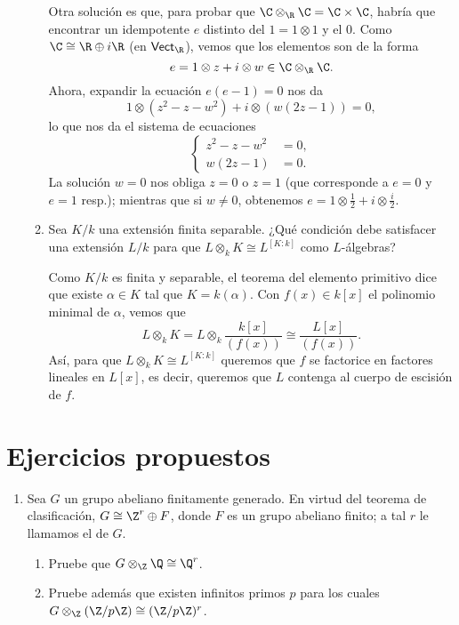 \documentclass[11pt, reqno]{amsart}
\begin{document}
\begin{enumerate}
\begin{enumerate}
\begin{sol}
					Otra solución es que, para probar que $\C\otimes_\R\C = \C\times\C$, habría que
					encontrar un idempotente $e$ distinto del $1 = 1\otimes 1$ y el 0.
					Como $\C \cong \R\oplus i\R$ (en $\mathsf{Vect}_\R$), vemos que los elementos
					son de la forma
					\[
						e = 1\otimes z + i\otimes w \in \C\otimes_\R\C.
					\]
					Ahora, expandir la ecuación $e(e - 1) = 0$ nos da
					\[
						1\otimes( z^2 - z - w^2 ) + i\otimes( w(2z - 1) ) = 0,
					\]
					lo que nos da el sistema de ecuaciones
					\[
						\left\{
						\begin{aligned}
							z^2 - z - w^2 &= 0, \\
							w(2z - 1) &= 0.
						\end{aligned}
						\right.
					\]
					La solución $w = 0$ nos obliga $z = 0$ o $z = 1$ (que corresponde a $e = 0$ y $e
					= 1$ resp.); mientras que si $w \ne 0$, obtenemos $e = 1\otimes \frac{1}{2} + i\otimes
					\frac{i}{2}$.
				\end{sol}

			\item Sea $K/k$ una extensión finita separable.
				¿Qué condición debe satisfacer una extensión $L/k$ para que $L \otimes_k K \cong
				L^{[K:k]}$ como $L$-álgebras?

				\begin{sol}
					Como $K/k$ es finita y separable, el teorema del elemento primitivo dice que
					existe $\alpha \in K$ tal que $K = k(\alpha)$.
					Con $f(x) \in k[x]$ el polinomio minimal de $\alpha$, vemos que
					\[
						L\otimes_k K = L\otimes_k \frac{k[x]}{(f(x))} \cong \frac{L[x]}{(f(x))}.
					\]
					Así, para que $L\otimes_k K \cong L^{[K:k]}$ queremos que $f$ se factorice en
					factores lineales en $L[x]$, es decir, queremos que $L$ contenga al cuerpo de
					escisión de $f$.
				\end{sol}
		\end{enumerate}
\end{enumerate}

\appendix
\section{Ejercicios propuestos}
\begin{enumerate}
	\item Sea $G$ un grupo abeliano finitamente generado.
		En virtud del teorema de clasificación, $G \cong \Z^r \oplus F$, donde $F$ es un grupo abeliano finito;
		a tal $r$ le llamamos el  de $G$.
		\begin{enumerate}
			\item Pruebe que $G \otimes_\Z \Q \cong \Q^r$.
			\item Pruebe además que existen infinitos primos $p$ para los cuales $G \otimes_\Z (\Z/p\Z)
				\cong (\Z/p\Z)^r$.
		\end{enumerate}
\end{enumerate}


\printbibliography
\end{document}
